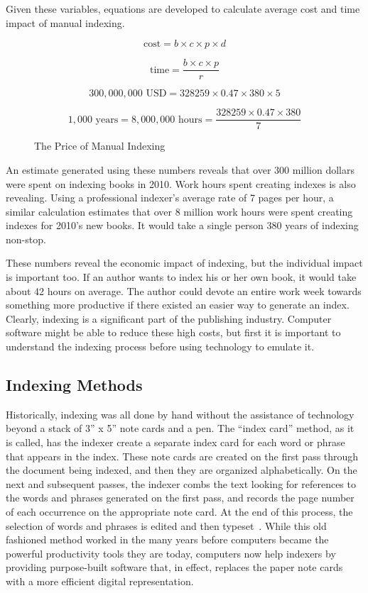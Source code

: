 Given these variables, equations are developed to calculate average cost and time impact of manual indexing.

\begin{figure}[H]
$$ \text{cost} = b \times c \times p \times d $$

$$ \text{time} = \frac{b \times c \times p}{r} $$

$$ 300,000,000 \text{ USD} = 328259 \times 0.47 \times 380 \times 5 $$

$$ 1,000 \text{ years} = 8,000,000 \text{ hours} = \frac{328259 \times 0.47 \times 380}{7}$$
\caption{The Price of Manual Indexing}
\end{figure}

An estimate generated using these numbers reveals that over 300 million dollars were spent on indexing books in 2010. Work hours spent creating indexes is also revealing.
Using a professional indexer's average rate of 7 pages per hour, a similar calculation estimates that over 8 million work hours were spent creating indexes for 2010's new books. It would take a single person 380 years of indexing non-stop.

These numbers reveal the economic impact of indexing, but the individual impact is important too.
If an author wants to index his or her own book, it would take about 42 hours on average. The author could devote an entire work week towards something more productive if there existed an easier way to generate an index.
Clearly, indexing is a significant part of the publishing industry.
Computer software might be able to reduce these high costs, but first it is important to understand the indexing process before using technology to emulate it.

\subsection{Indexing Methods}
\label{sec:indexing-methods}

Historically, indexing was all done by hand without the assistance of technology beyond a stack of 3'' x 5'' note cards and a pen.
The ``index card'' method, as it is called, has the indexer create a separate index card for each word or phrase that appears in the index.
These note cards are created on the first pass through the document being indexed, and then they are organized alphabetically.
On the next and subsequent passes, the indexer combs the text looking for references to the words and phrases generated on the first pass, and records the page number of each occurrence on the appropriate note card.
At the end of this process, the selection of words and phrases is edited and then typeset~\cite{mulvany}.
While this old fashioned method worked in the many years before computers became the powerful productivity tools they are today, computers now help indexers by providing purpose-built software that, in effect, replaces the paper note cards with a more efficient digital representation.

